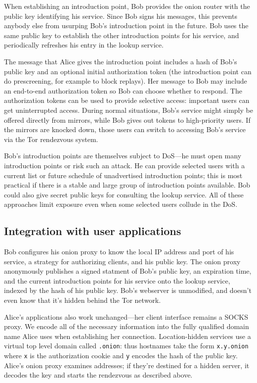 \documentclass[twocolumn]{article}
\begin{document}
When establishing an introduction point, Bob provides the onion router
with the public key identifying his service.  Since Bob signs his
messages, this prevents anybody else from usurping Bob's introduction point
in the future. Bob uses the same public key to establish the other
introduction points for his service, and periodically refreshes his
entry in the lookup service.

The message that Alice gives
the introduction point includes a hash of Bob's public key %
and an optional initial authorization token (the
introduction point can do prescreening, for example to block replays). Her
message to Bob may include an end-to-end authorization token so Bob
can choose whether to respond.
The authorization tokens can be used to provide selective access:
important users can get uninterrupted access.
During normal situations, Bob's service might simply be offered
directly from mirrors, while Bob gives out tokens to high-priority users. If
the mirrors are knocked down,
those users can switch to accessing Bob's service via
the Tor rendezvous system.

Bob's introduction points are themselves subject to DoS---he must
open many introduction points or risk such an attack.
He can provide selected users with a current list or future schedule of
unadvertised introduction points;
this is most practical
if there is a stable and large group of introduction points
available. Bob could also give secret public keys
for consulting the lookup service. All of these approaches
limit exposure even when
some selected users collude in the DoS\@.

\subsection{Integration with user applications}

Bob configures his onion proxy to know the local IP address and port of his
service, a strategy for authorizing clients, and his public key. The onion
proxy anonymously publishes a signed statment of Bob's
public key, an expiration time, and
the current introduction points for his service onto the lookup service,
indexed
by the hash of his public key.  Bob's webserver is unmodified,
and doesn't even know that it's hidden behind the Tor network.

Alice's applications also work unchanged---her client interface
remains a SOCKS proxy.  We encode all of the necessary information
into the fully qualified domain name Alice uses when establishing her
connection. Location-hidden services use a virtual top level domain
called {\tt .onion}: thus hostnames take the form {\tt x.y.onion} where
{\tt x} is the authorization cookie and {\tt y} encodes the hash of
the public key. Alice's onion proxy
examines addresses; if they're destined for a hidden server, it decodes
the key and starts the rendezvous as described above.
\end{document}
